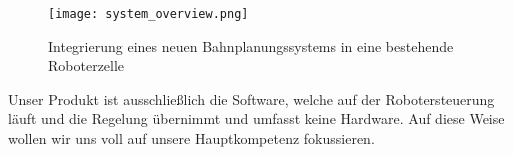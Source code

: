 \begin{figure}[h]
	\centering
	\texttt{[image: system\_overview.png]}
	\caption{Integrierung eines neuen Bahnplanungssystems in eine bestehende Roboterzelle}
	\label{fig:IntegrationBahnplanungssystem}
\end{figure}

Unser Produkt ist ausschließlich die Software, welche auf der Robotersteuerung läuft und die Regelung übernimmt und umfasst keine Hardware. Auf diese Weise wollen wir uns voll auf unsere Hauptkompetenz fokussieren. 
